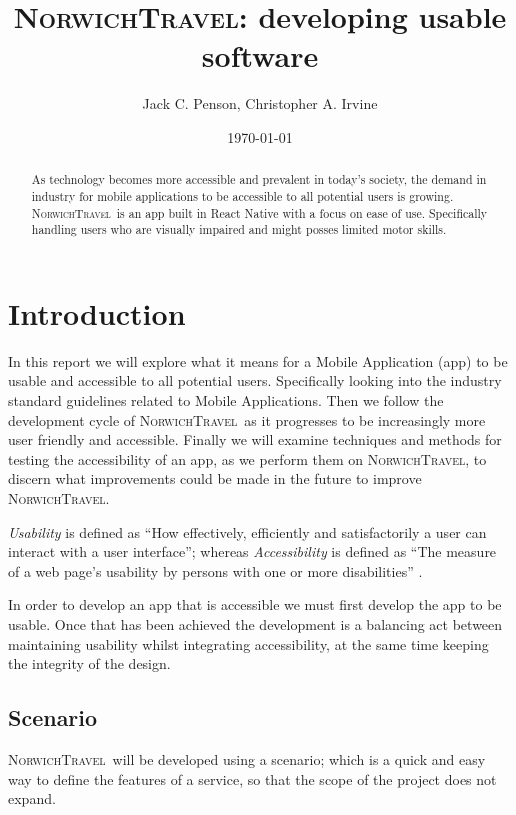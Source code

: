 \documentclass[cmpstyle]{ueacmpstyle}
\newcommand{\nt}{\textsc{NorwichTravel}}
\begin{document}
	\title{\textsc{NorwichTravel}: developing usable software}
	\author{Jack C. Penson, Christopher A. Irvine}
	\date{\today}
	\maketitle
	\begin{abstract}
		As technology becomes more accessible and prevalent in today's society, the demand in industry for mobile applications to be accessible to all potential users is growing. \nt \ is an app built in React Native with a focus on ease of use. Specifically handling users who are visually impaired and might posses limited motor skills. %
	\end{abstract}
	\section{Introduction} \label{sec:intro}
	In this report we will explore what it means for a Mobile Application (app) to be usable and accessible to all potential users. Specifically looking into the industry standard guidelines related to Mobile Applications. Then we follow the development cycle of \nt \ as it progresses to be increasingly more user friendly and accessible. Finally we will examine techniques and methods for testing the accessibility of an app, as we perform them on \nt, to discern what improvements could be made in the future to improve \nt.
	
	\textit{Usability} is defined as ``How effectively, efficiently and satisfactorily a user can interact with a user interface''; whereas \textit{Accessibility} is defined as ``The measure of a web page's usability by persons with one or more disabilities'' \citep{usability}.
	
	In order to develop an app that is accessible we must first develop the app to be usable. Once that has been achieved the development is a balancing act between maintaining usability whilst integrating accessibility, at the same time keeping the integrity of the design.
	
		\subsection{Scenario} \label{sec:scenario}
		\nt \ will be developed using a scenario; which is a quick and easy way to define the features of a service, so that the scope of the project does not expand.
		
\end{document}
